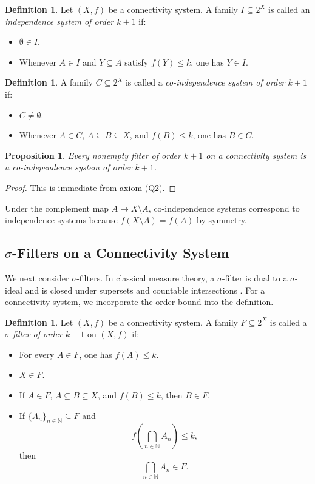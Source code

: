 \documentclass[10pt]{book}
\newtheorem{proposition}[theorem]{Proposition}
\theoremstyle{definition}
\newtheorem{definition}[theorem]{Definition}
\begin{document}
\begin{definition}
Let \((X,f)\) be a connectivity system.  
A family \(I\subseteq 2^X\) is called an \emph{independence system of order \(k+1\)} if:
\begin{itemize}
    \item[(IN1)] \(\emptyset \in I\).
    \item[(IN2)] Whenever \(A\in I\) and \(Y\subseteq A\) satisfy \(f(Y)\leq k\), one has \(Y\in I\).
\end{itemize}
\end{definition}

\begin{definition}
A family \(C\subseteq 2^X\) is called a \emph{co-independence system of order \(k+1\)} if:
\begin{itemize}
    \item[(COIN1)] \(C\neq \emptyset\).
    \item[(COIN2)] Whenever \(A\in C\), \(A\subseteq B\subseteq X\), and \(f(B)\leq k\), one has \(B\in C\).
\end{itemize}
\end{definition}

\begin{proposition}
Every nonempty filter of order \(k+1\) on a connectivity system is a co-independence system of order \(k+1\).
\end{proposition}

\begin{proof}
This is immediate from axiom (Q2).
\end{proof}

Under the complement map \(A\mapsto X\setminus A\), co-independence systems correspond to independence systems because \(f(X\setminus A)=f(A)\) by symmetry.

\subsection{\(\sigma\)-Filters on a Connectivity System}

We next consider \(\sigma\)-filters.  
In classical measure theory, a \(\sigma\)-filter is dual to a \(\sigma\)-ideal and is closed under supersets and countable intersections \cite{bauer2001measure}.  
For a connectivity system, we incorporate the order bound into the definition.

\begin{definition}
Let \((X,f)\) be a connectivity system.  
A family \(F\subseteq 2^X\) is called a \emph{\(\sigma\)-filter of order \(k+1\)} on \((X,f)\) if:
\begin{itemize}
    \item[(SIF0)] For every \(A\in F\), one has \(f(A)\leq k\).
    \item[(SIF1)] \(X\in F\).
    \item[(SIF2)] If \(A\in F\), \(A\subseteq B\subseteq X\), and \(f(B)\leq k\), then \(B\in F\).
    \item[(SIF3)] If \(\{A_n\}_{n\in\mathbb{N}}\subseteq F\) and
    \[
    f\!\left(\bigcap_{n\in\mathbb{N}} A_n\right)\leq k,
    \]
    then
    \[
    \bigcap_{n\in\mathbb{N}} A_n \in F.
    \]
\end{itemize}
\end{definition}
\end{document}
